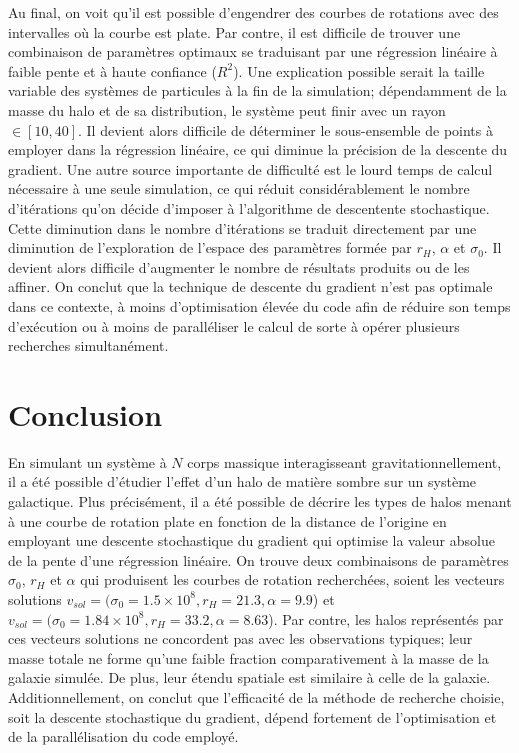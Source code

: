 \documentclass{article}
\begin{document}
Au final, on voit qu'il est possible d'engendrer des courbes de rotations avec des intervalles où la courbe est plate. Par contre, il est difficile de trouver une combinaison de paramètres optimaux se traduisant par une régression linéaire à faible pente et à haute confiance ($R^2$). Une explication possible serait la taille variable des systèmes de particules à la fin de la simulation; dépendamment de la masse du halo et de sa distribution, le système peut finir avec un rayon $\in [10,40]$. Il devient alors difficile de déterminer le sous-ensemble de points à employer dans la régression linéaire, ce qui diminue la précision de la descente du gradient. Une autre source importante de difficulté est le lourd temps de calcul nécessaire à une seule simulation, ce qui réduit considérablement le nombre d'itérations qu'on décide d'imposer à l'algorithme de descentente stochastique. Cette diminution dans le nombre d'itérations se traduit directement par une diminution de l'exploration de l'espace des paramètres formée par $r_H$, $\alpha$ et $\sigma_0$. Il devient alors difficile d'augmenter le nombre de résultats produits ou de les affiner. On conclut que la technique de descente du gradient n'est pas optimale dans ce contexte, à moins d'optimisation élevée du code afin de réduire son temps d'exécution ou à moins de paralléliser le calcul de sorte à opérer plusieurs recherches simultanément.


\section*{Conclusion}

En simulant un système à $N$ corps massique interagisseant gravitationnellement, il a été possible d'étudier l'effet d'un halo de matière sombre sur un système galactique. Plus précisément, il a été possible de décrire les types de halos menant à une courbe de rotation plate en fonction de la distance de l'origine en employant une descente stochastique du gradient qui optimise la valeur absolue de la pente d'une régression linéaire. On trouve deux combinaisons de paramètres $\sigma_0$, $r_H$ et $\alpha$ qui produisent les courbes de rotation recherchées, soient les vecteurs solutions $v_{sol}=(\sigma_0=1.5\times 10^8, r_H=21.3, \alpha=9.9$) et $v_{sol}=(\sigma_0=1.84\times 10^8, r_H=33.2, \alpha=8.63$). Par contre, les halos représentés par ces vecteurs solutions ne concordent pas avec les observations typiques; leur masse totale ne forme qu'une faible fraction comparativement à la masse de la galaxie simulée. De plus, leur étendu spatiale est similaire à celle de la galaxie. Additionnellement, on conclut que l'efficacité de la méthode de recherche choisie, soit la descente stochastique du gradient, dépend fortement de l'optimisation et de la parallélisation du code employé.
\end{document}
